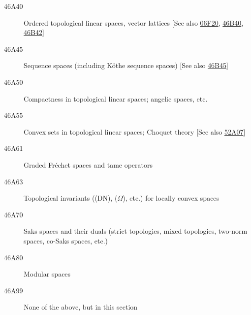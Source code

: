 \documentclass[letterpaper]{article}
\begin{document}
\begin{description}
\item [46A40]\label{46A40} Ordered topological linear spaces, vector lattices [See also \hyperref[06F20]{06F20}, \hyperref[46B40]{46B40}, \hyperref[46B42]{46B42}]
\item [46A45]\label{46A45} Sequence spaces (including K\"{o}the sequence spaces) [See also \hyperref[46B45]{46B45}]
\item [46A50]\label{46A50} Compactness in topological linear spaces; angelic spaces, etc.
\item [46A55]\label{46A55} Convex sets in topological linear spaces; Choquet theory [See also \hyperref[52A07]{52A07}]
\item [46A61]\label{46A61} Graded Fr\'{e}chet spaces and tame operators
\item [46A63]\label{46A63} Topological invariants ((DN), ($\Omega$), etc.) for locally convex spaces
\item [46A70]\label{46A70} Saks spaces and their duals (strict topologies, mixed topologies, two-norm spaces, co-Saks spaces, etc.)
\item [46A80]\label{46A80} Modular spaces
\item [46A99]\label{46A99} None of the above, but in this section
\end{description}
\end{document}
